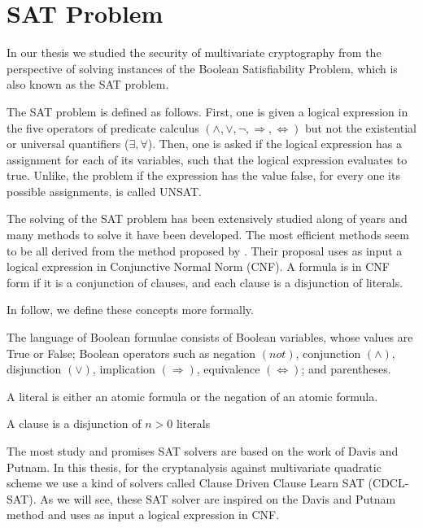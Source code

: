 \chapter{{SAT Problem}}
\label{chap:satisfiability}

In our thesis we studied the security of multivariate cryptography from the perspective of solving instances of the Boolean Satisfiability Problem, which is also known as the SAT problem. 


The SAT problem is defined as follows. First, one is given a logical expression in the five operators of predicate calculus $(\wedge, \vee, \neg, \Rightarrow, \iff )$ but not the existential or universal quantifiers ($\exists, \forall$). Then, one is asked if the logical expression has a assignment for each of its variables, such that the logical expression evaluates to true. Unlike, the problem if the expression has the value false, for every one its possible assignments, is called UNSAT.

The solving of the SAT problem has been extensively studied along of years and many methods to solve it have been developed. The most efficient methods seem to be all derived from the method proposed by \cite{davis1958reductions}. Their proposal uses as input a logical expression in Conjunctive Normal Norm (CNF). A formula is in CNF form if it is a conjunction of clauses, and each clause is a disjunction of literals. 

In follow, we define these concepts more formally.

\begin{defn}
The language of Boolean formulae consists of Boolean variables, whose values are True or False; Boolean operators such as negation $(not)$, conjunction $(\wedge)$, disjunction $(\vee)$, implication $(\Rightarrow)$, equivalence $(\iff)$; and parentheses.
\end{defn}

\begin{defn}
A literal is either an atomic formula or the negation of an atomic formula.
\end{defn}

\begin{defn}
A clause is a disjunction of $n >0$ literals
\end{defn}
The most study and promises SAT solvers are based on the work of Davis and Putnam. In this thesis, for the cryptanalysis against multivariate quadratic scheme we use a kind of solvers called Clause Driven Clause Learn SAT (CDCL-SAT). As we will see, these SAT solver are inspired on the Davis and Putnam method and uses as input a logical expression in CNF. 

